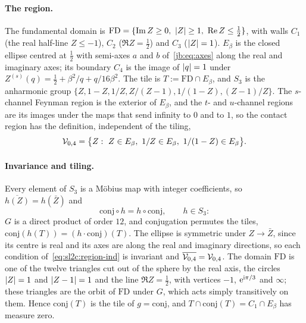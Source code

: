 \paragraph{The region.}
The fundamental domain is $\mathrm{FD} = \{ \operatorname{Im} Z \ge 0, \ {|Z|} \ge 1, \ \operatorname{Re} Z \le \frac{1}{2} \}$, with walls $C_1$ (the real half-line $Z \le - 1$), $C_2$ ($\Re Z = \frac{1}{2}$) and $C_3$ (${|Z|} = 1$).
$E_\beta$ is the closed ellipse centred at $\frac{1}{2}$ with semi-axes $a$ and $b$ of~\eqref{jb:eq:axes} along the real and imaginary axes; its boundary $C_4$ is the image of ${|q|} = 1$ under $Z^{(s)}(q) = \frac{1}{2} + \beta^2 / q + q / 16 \beta^2$.
The tile is $T := \mathrm{FD} \cap E_\beta$, and $S_3$ is the anharmonic group $\{ Z, 1 - Z, 1 / Z, Z / (Z - 1), 1 / (1 - Z), (Z - 1) / Z \}$.
The $s$-channel Feynman region is the exterior of $E_\beta$, and the $t$- and $u$-channel regions are its images under the maps that send infinity to $0$ and to $1$, so the contact region has the definition, independent of the tiling,
\begin{equation}
  \label{eq:sl2c:region-ind}
  {\mathcal{V}}_{0,4}
    = \big\{ Z : \ Z \in E_\beta, \ 1 / Z \in E_\beta, \ 1 / (1 - Z) \in E_\beta \big\}.
\end{equation}

\paragraph{Invariance and tiling.}
Every element of $S_3$ is a Möbius map with integer coefficients, so $\overline{h(Z)} = h(\bar Z)$ and
\begin{equation}
  \mathrm{conj} \circ h
    = h \circ \mathrm{conj},
  \qquad
  h \in S_3:
\end{equation}
$G$ is a direct product of order $12$, and conjugation permutes the tiles, $\mathrm{conj}(h(T)) = (h \cdot \mathrm{conj})(T)$.
The ellipse is symmetric under $Z \to \bar Z$, since its centre is real and its axes are along the real and imaginary directions, so each condition of~\eqref{eq:sl2c:region-ind} is invariant and $\overline{{\mathcal{V}}_{0,4}} = {\mathcal{V}}_{0,4}$.
The domain $\mathrm{FD}$ is one of the twelve triangles cut out of the sphere by the real axis, the circles ${|Z|} = 1$ and ${|Z - 1|} = 1$ and the line $\Re Z = \frac{1}{2}$, with vertices $-1$, $\mathrm{e}^{\mathrm{i} \pi / 3}$ and $\infty$; these triangles are the orbit of $\mathrm{FD}$ under $G$, which acts simply transitively on them.
Hence $\mathrm{conj}(T)$ is the tile of $g = \mathrm{conj}$, and $T \cap \mathrm{conj}(T) = C_1 \cap E_\beta$ has measure zero.

